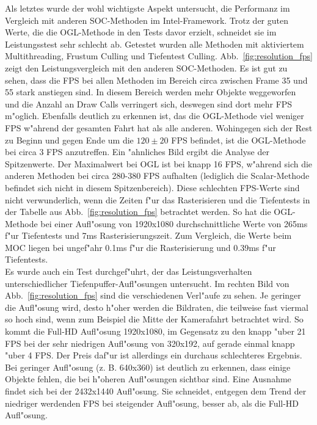 \documentclass[journal]{vgtc}
\begin{document}
Als letztes wurde der wohl wichtigste Aspekt untersucht, die Performanz im Vergleich mit anderen SOC-Methoden im Intel-Framework.
Trotz der guten Werte, die die OGL-Methode in den Tests  davor erzielt, schneidet sie im Leistungsstest sehr schlecht ab.
Getestet wurden alle Methoden mit aktiviertem Multithreading, Frustum Culling und Tiefentest Culling. Abb.\ \ref{fig:resolution_fps} zeigt den Leistungsvergleich mit den anderen SOC-Methoden.
Es ist gut zu sehen, dass die FPS bei allen Methoden im Bereich circa zwischen Frame 35 und 55 stark anstiegen sind.
In diesem Bereich werden mehr Objekte weggeworfen und die Anzahl an Draw Calls verringert sich, deswegen sind dort mehr FPS m"oglich.
Ebenfalls deutlich zu erkennen ist, das die OGL-Methode viel weniger FPS w"ahrend der gesamten Fahrt hat als alle anderen.
Wohingegen sich der Rest zu Beginn und gegen Ende um die $120\pm20$ FPS befindet, ist die OGL-Methode bei circa 3 FPS anzutreffen.
Ein "ahnliches Bild ergibt die Analyse der Spitzenwerte.
Der Maximalwert bei OGL ist bei knapp 16 FPS, w"ahrend sich die anderen Methoden bei circa 280-380 FPS aufhalten (lediglich die Scalar-Methode befindet sich nicht in diesem Spitzenbereich).
Diese schlechten FPS-Werte sind nicht verwunderlich, wenn die Zeiten f"ur das Rasterisieren und die Tiefentests in der Tabelle aus Abb.\ \ref{fig:resolution_fps} betrachtet werden.
So hat die OGL-Methode bei einer Aufl"osung von 1920x1080 durchschnittliche Werte von 265ms f"ur Tiefentests und 7ms Rasterisierungszeit.
Zum Vergleich, die Werte beim MOC liegen bei ungef"ahr 0.1ms f"ur die Rasterisierung und 0.39ms f"ur Tiefentests.\\

Es wurde auch ein Test durchgef"uhrt, der das Leistungsverhalten unterschiedlicher Tiefenpuffer-Aufl"osungen untersucht.
Im rechten Bild von Abb.\ \ref{fig:resolution_fps} sind die verschiedenen Verl"aufe zu sehen.
Je geringer die Aufl"osung wird, desto h"oher werden die Bildraten, die teilweise fast viermal so hoch sind, wenn zum Beispiel die Mitte der Kamerafahrt betrachtet wird.
So kommt die Full-HD Aufl"osung 1920x1080, im Gegensatz zu den knapp "uber 21 FPS bei der sehr niedrigen Aufl"osung von 320x192, auf gerade einmal knapp "uber 4 FPS. Der Preis daf"ur ist allerdings ein durchaus schlechteres Ergebnis.
Bei geringer Aufl"osung (z. B. 640x360) ist deutlich zu erkennen, dass einige Objekte fehlen, die bei h"oheren Aufl"osungen sichtbar sind.
Eine Ausnahme findet sich bei der 2432x1440 Aufl"osung.
Sie schneidet, entgegen dem Trend der niedriger werdenden FPS bei steigender Aufl"osung, besser ab, als die Full-HD Aufl"osung.\\
\end{document}
